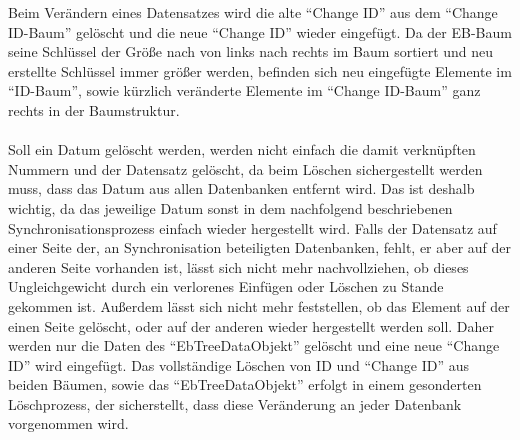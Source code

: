 \documentclass[a4paper,11pt,oneside,%
headsepline,												%
footsepline,												%
bibtotocnumbered									%
]{scrreprt}
\begin{document}
Beim Verändern eines Datensatzes wird die alte \enquote{Change ID} aus dem \enquote{Change ID-Baum} gelöscht und die neue \enquote{Change ID} wieder eingefügt. Da der \ac{EB-Baum} seine Schlüssel der Größe nach von links nach rechts im Baum sortiert und neu erstellte Schlüssel immer größer werden, befinden sich neu eingefügte Elemente im \enquote{ID-Baum}, sowie kürzlich veränderte Elemente im \enquote{Change ID-Baum} ganz rechts in der Baumstruktur.\\\\
Soll ein Datum gelöscht werden, werden nicht einfach die damit verknüpften Nummern und der Datensatz gelöscht, da beim Löschen sichergestellt werden muss, dass das Datum aus allen Datenbanken entfernt wird. Das ist deshalb wichtig, da das jeweilige Datum sonst in dem nachfolgend beschriebenen Synchronisationsprozess einfach wieder hergestellt wird. Falls der Datensatz auf einer Seite der, an Synchronisation beteiligten Datenbanken, fehlt, er aber auf der anderen Seite vorhanden ist, lässt sich nicht mehr nachvollziehen, ob dieses Ungleichgewicht durch ein verlorenes Einfügen oder Löschen zu Stande gekommen ist. Außerdem lässt sich nicht mehr feststellen, ob das Element auf der einen Seite gelöscht, oder auf der anderen wieder hergestellt werden soll. Daher werden nur die Daten des \enquote{EbTreeDataObjekt} gelöscht und eine neue \enquote{Change ID} wird eingefügt. Das vollständige Löschen von \ac{ID} und \enquote{Change ID} aus beiden Bäumen, sowie das \enquote{EbTreeDataObjekt} erfolgt in einem gesonderten Löschprozess, der sicherstellt, dass diese Veränderung an jeder Datenbank vorgenommen wird.
\end{document}
